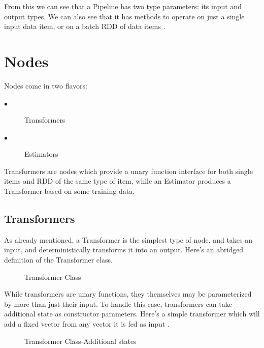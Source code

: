 \documentclass[9pt,twocolumn,twoside]{../../styles/osajnl}
\begin{document}
From this we can see that a Pipeline has two type parameters: its
input and output types. We can also see that it has methods to operate
on just a single input data item, or on a batch RDD of data items \cite{www-keystoneml1} .

\section{Nodes}

Nodes come in two flavors:

\begin{description}
\item[$\bullet$] Transformers
\item[$\bullet$] Estimators
\end{description}


Transformers are nodes which provide a unary function interface for
both single items and RDD of the same type of item, while an Estimator
produces a Transformer based on some training data.
\subsection{Transformers}

As already mentioned, a Transformer is the simplest type of node, and
takes an input, and deterministically transforms it into an
output. Here’s an abridged definition of the Transformer class.

\begin{figure}[htbp]
\centering
{}
\caption{Transformer Class}
\label{fig:Transformer Class}
\end{figure}

While transformers are unary functions, they themselves may be
parameterized by more than just their input. To handle this case,
transformers can take additional state as constructor
parameters. Here’s a simple transformer which will add a fixed vector
from any vector it is fed as input \cite{www-keystoneml1} .

\begin{figure}[htbp]
\centering
{}
\caption{Transformer Class-Additional states}
\label{fig:Transformer Class-Additional states}
\end{figure}
\end{document}
